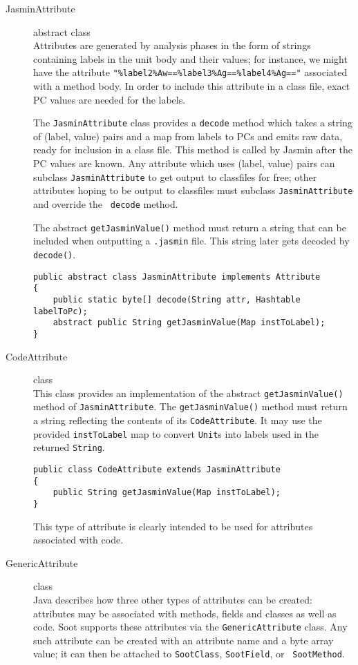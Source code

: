 \documentclass{article}
\begin{document}
\begin{description}
\item[JasminAttribute] abstract class\\
Attributes are generated by analysis phases in the form
of strings containing labels in the unit body and their values;
for instance, we might have the attribute
\verb+"%label2%Aw==%label3%Ag==%label4%Ag=="+ 
associated with a method body.  In order to include this
attribute in a class file, exact PC values are needed for the
labels.  

The {\tt JasminAttribute} class provides a {\tt decode} method which
takes a string of (label, value) pairs and a map from labels to PCs
and emits raw data, ready for inclusion in a class file.  This method
is called by Jasmin after the PC values are known.  Any attribute
which uses (label, value) pairs can subclass {\tt JasminAttribute} to get
output to classfiles for free; other attributes hoping to be output to
classfiles must subclass {\tt JasminAttribute} and override the {\tt
decode} method.

The abstract {\tt getJasminValue()} method must return a string that
can be included when outputting a {\tt .jasmin} file.  This string
later gets decoded by {\tt decode()}.
    
\begin{verbatim}
public abstract class JasminAttribute implements Attribute
{
    public static byte[] decode(String attr, Hashtable labelToPc);
    abstract public String getJasminValue(Map instToLabel);
}
\end{verbatim}

\item[CodeAttribute] class\\
This class provides an implementation of the abstract
{\tt getJasminValue()} method of {\tt JasminAttribute}.
The {\tt getJasminValue()} method must return a string reflecting
the contents of its {\tt CodeAttribute}.  It may use the provided
{\tt instToLabel} map to convert {\tt Unit}s into labels used in the
returned {\tt String}.

\begin{verbatim}
public class CodeAttribute extends JasminAttribute
{
    public String getJasminValue(Map instToLabel);
}
\end{verbatim}

This type of attribute is clearly intended to be used for attributes
associated with code.

\item[GenericAttribute] class\\ Java describes how three other types
of attributes can be created: attributes may be associated with
methods, fields and classes as well as code.  Soot supports these
attributes via the {\tt GenericAttribute} class.  Any such attribute
can be created with an attribute name and a byte array value; it can
then be attached to {\tt SootClass}, {\tt SootField}, or {\tt
SootMethod}.


\end{description}
\end{document}
